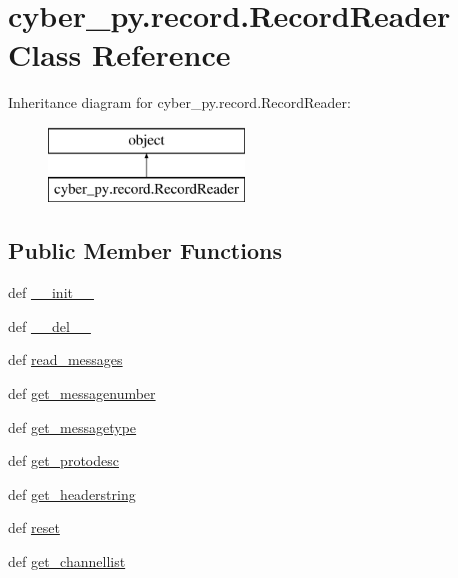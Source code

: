 \hypertarget{classcyber__py_1_1record_1_1RecordReader}{\section{cyber\-\_\-py.\-record.\-Record\-Reader Class Reference}
\label{classcyber__py_1_1record_1_1RecordReader}
}
Inheritance diagram for cyber\-\_\-py.\-record.\-Record\-Reader\-:\begin{figure}[H]
\begin{center}
\leavevmode
\includegraphics[height=2.000000cm]{classcyber__py_1_1record_1_1RecordReader}
\end{center}
\end{figure}
\subsection*{Public Member Functions}
\begin{DoxyCompactItemize}
\item 
def \hyperlink{classcyber__py_1_1record_1_1RecordReader_ae1675795a460676ce3b860f834e56058}{\-\_\-\-\_\-init\-\_\-\-\_\-}
\item 
def \hyperlink{classcyber__py_1_1record_1_1RecordReader_a686bc86351940d891137de4105e8c623}{\-\_\-\-\_\-del\-\_\-\-\_\-}
\item 
def \hyperlink{classcyber__py_1_1record_1_1RecordReader_a69bf49674d4888f3e46f50c17ae28b47}{read\-\_\-messages}
\item 
def \hyperlink{classcyber__py_1_1record_1_1RecordReader_a791219aa5d7c9f1a297bf2df08236dd9}{get\-\_\-messagenumber}
\item 
def \hyperlink{classcyber__py_1_1record_1_1RecordReader_aea88f92c5a6a99c1e60ab55f8de36d8d}{get\-\_\-messagetype}
\item 
def \hyperlink{classcyber__py_1_1record_1_1RecordReader_a14dd6d3103f79d20f128cd62c4445ab0}{get\-\_\-protodesc}
\item 
def \hyperlink{classcyber__py_1_1record_1_1RecordReader_ace780ed8cc01f1b07699788c567d4439}{get\-\_\-headerstring}
\item 
def \hyperlink{classcyber__py_1_1record_1_1RecordReader_ab6771cc37151e1330f3fe650bbbdbe8c}{reset}
\item 
def \hyperlink{classcyber__py_1_1record_1_1RecordReader_a9cfcc842e5bd70c08edc96f29ae4729f}{get\-\_\-channellist}
\end{DoxyCompactItemize}
